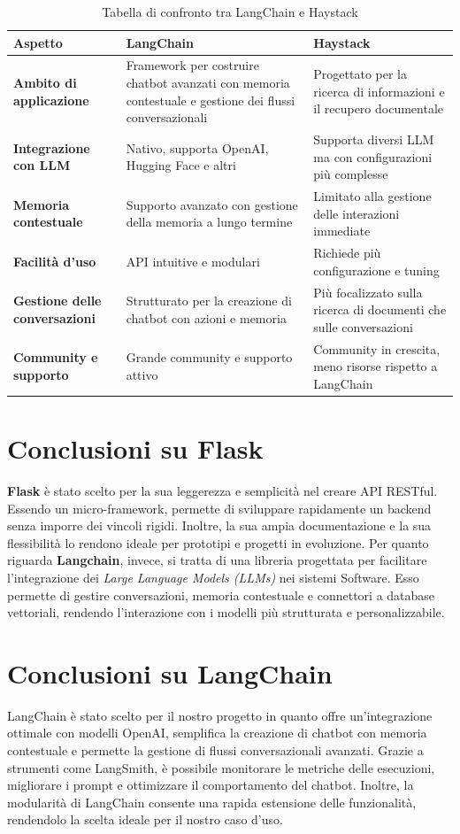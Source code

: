 \documentclass{article}
\begin{document}
\begin{table}[H]
    \renewcommand{\arraystretch}{1.7}
    \centering
    \begin{tabular}{|p{2.55cm}|p{5cm}|p{5cm}|}
    \hline
    \textbf{Aspetto} & \textbf{LangChain} & \textbf{Haystack} \\
    \hline
    \textbf{Ambito di applicazione} & Framework per costruire chatbot avanzati con memoria contestuale e gestione dei flussi conversazionali & Progettato per la ricerca di informazioni e il recupero documentale \\
    \hline
    \textbf{Integrazione con LLM} & Nativo, supporta OpenAI, Hugging Face e altri & Supporta diversi LLM ma con configurazioni più complesse \\
    \hline
    \textbf{Memoria contestuale} & Supporto avanzato con gestione della memoria a lungo termine & Limitato alla gestione delle interazioni immediate \\
    \hline
    \textbf{Facilità d'uso} & API intuitive e modulari & Richiede più configurazione e tuning \\
    \hline
    \textbf{Gestione delle conversazioni} & Strutturato per la creazione di chatbot con azioni e memoria & Più focalizzato sulla ricerca di documenti che sulle conversazioni \\
    \hline
    \textbf{Community e supporto} & Grande community e supporto attivo & Community in crescita, meno risorse rispetto a LangChain \\
    \hline
    \end{tabular}
    \caption{Tabella di confronto tra LangChain e Haystack}
\end{table}

\section{Conclusioni su Flask}
\textbf{Flask} è stato scelto per la sua leggerezza e semplicità nel creare 
API RESTful. Essendo un micro-framework, permette di sviluppare 
rapidamente un backend senza imporre dei vincoli rigidi. 
Inoltre, la sua ampia documentazione e la sua flessibilità lo rendono 
ideale per prototipi e progetti in evoluzione.
Per quanto riguarda \textbf{Langchain}, invece, si tratta di una libreria
progettata per facilitare l'integrazione dei \textit{Large Language Models (LLMs)}
nei sistemi Software. Esso permette di gestire conversazioni, memoria
contestuale e connettori a database vettoriali, rendendo l'interazione 
con i modelli più strutturata e personalizzabile.

\section{Conclusioni su LangChain}
LangChain è stato scelto per il nostro progetto in quanto offre un'integrazione ottimale con modelli OpenAI, 
semplifica la creazione di chatbot con memoria contestuale e permette la gestione di flussi conversazionali avanzati. 
Grazie a strumenti come LangSmith, è possibile monitorare le metriche delle esecuzioni, 
migliorare i prompt e ottimizzare il comportamento del chatbot. Inoltre, 
la modularità di LangChain consente una rapida estensione delle funzionalità, rendendolo la scelta ideale per il nostro caso d'uso.
\end{document}
